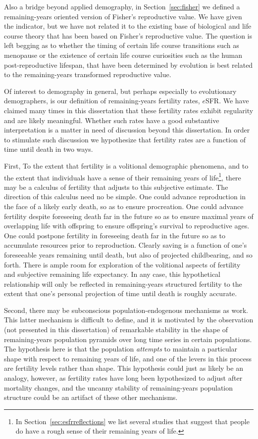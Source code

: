 Also a bridge beyond applied demography, in Section~\ref{sec:fisher} we
defined a remaining-years oriented version of Fisher's reproductive value. We
have given the indicator, but we have not related it to the existing base of
biological and life course theory that has been based on Fisher's reproductive
value. The question is left begging as to whether the timing of certain
life course transitions such as menopause or the existence of certain
life course curiosities such as the human post-reproductive lifespan, that have
been determined by evolution is best related to the remaining-years transformed 
reproductive value. 

Of interest to demography in general, but perhaps especially to evolutionary
demographers, is our definition of remaining-years fertility rates, $e$SFR. We
have claimed many times in this dissertation that these fertility rates exhibit
regularity and are likely meaningful. Whether such rates have a good substantive
interpretation is a matter in need of discussion beyond this dissertation.
In order to stimulate such discussion we hypothesize that fertility rates are a
function of time until death in two ways. 

First, To the extent that fertility is
a volitional demographic phenomena, and to the extent that individuals have a
sense of their remaining years of life\footnote{In
Section~\ref{sec:esfrreflections} we list several studies that suggest that people do have a rough sense of their
remaining years of life.}, there may be a calculus of fertility that adjusts to
this subjective estimate. The direction of this calculus need no be simple. One
could advance reproduction in the face of a likely early death, so as to ensure
procreation. One could advance fertility despite foreseeing death far in the
future so as to ensure maximal years of overlapping life with offspring to ensure 
offspring's survival to reproductive ages. One could postpone fertility in
foreseeing death far in the future so as to accumulate resources prior to
reproduction. Clearly saving is a function of one's foreseeable years
remaining until death, but also of projected childbearing, and so forth. There
is ample room for exploration of the volitional aspects of fertility and
subjective remaining life expectancy. In any case, this hypothetical
relationship will only be reflected in remaining-years structured fertility to
the extent that one's personal projection of time until death is roughly
accurate. 

Second, there may be subconscious population-endogenous mechanisms as work. This
latter mechanism is difficult to define, and it is motivated by the observation
(not presented in this dissertation) of remarkable stability in the shape of
remaining-years population pyramids over long time series in certain
populations. The hypothesis here is that the population \textit{attempts} to 
maintain a particular shape with respect to remaining years of life, and one of
the levers in this process are fertility levels rather than shape. This
hypothesis could just as likely be an analogy, however, as fertility rates have
long been hypothesized to adjust after mortality changes, and the uncanny
stability of remaining-years population structure could be an artifact of these
other mechanisms. 


